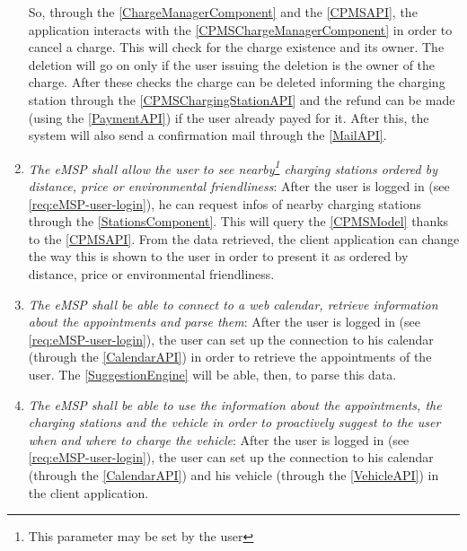 \begin{enumerate}[label=\textbf{R\arabic*}]
    So, through the \ref{ChargeManagerComponent} and the \ref{CPMSAPI}, the application interacts with the \ref{CPMSChargeManagerComponent} in order to cancel a charge. This will check for the charge existence and its owner. The deletion will go on only if the user issuing the deletion is the owner of the charge.
    After these checks the charge can be deleted informing the charging station through the \ref{CPMSChargingStationAPI} and the refund can be made (using the \ref{PaymentAPI}) if the user already payed for it.
    After this, the system will also send a confirmation mail through the \ref{MailAPI}.
    \label{req:eMSP-refund}
    \item \textit{The \ac{eMSP} shall allow the user to see nearby\footnote{This parameter may be set by the user} charging stations ordered by distance, price or environmental friendliness}:
    After the user is logged in (see \ref{req:eMSP-user-login}), he can request infos of nearby charging stations through the \ref{StationsComponent}. This will query the \ref{CPMSModel} thanks to the \ref{CPMSAPI}. From the data retrieved, the client application can change the way this is shown to the user in order to present it as ordered by distance, price or environmental friendliness.
    \label{req:eMSP-see-stations}
    \item \textit{The \ac{eMSP} shall be able to connect to a web calendar, retrieve information about the appointments and parse them}:
    After the user is logged in (see \ref{req:eMSP-user-login}), the user can set up the connection to his calendar (through the \ref{CalendarAPI}) in order to retrieve the appointments of the user. The \ref{SuggestionEngine} will be able, then, to parse this data.
    \label{req:eMSP-connect-calendar}
    \item \textit{The \ac{eMSP} shall be able to use the information about the appointments, the charging stations and the vehicle in order to proactively suggest to the user when and where to charge the vehicle}:
    After the user is logged in (see \ref{req:eMSP-user-login}), the user can set up the connection to his calendar (through the \ref{CalendarAPI}) and his vehicle (through the \ref{VehicleAPI}) in the client application.

\end{enumerate}
